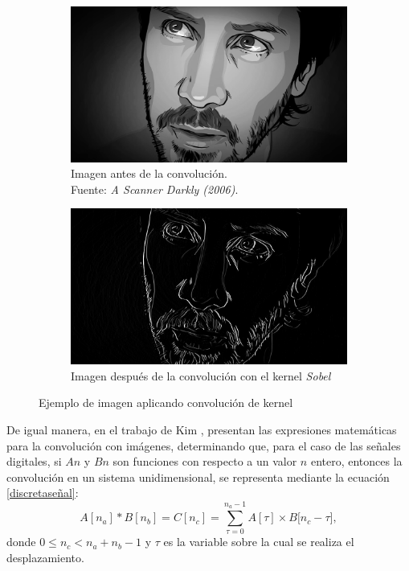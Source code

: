 \documentclass{article}
\begin{document}
\begin{figure}[h]
    \begin{center}
    \captionsetup{justification=centering}
    \begin{subfigure}[b]{0.4\textwidth}
        \includegraphics[scale=0.22]{Figures/darkly.jpg}
        \caption{Imagen antes de la convolución. \\ Fuente: \textit{A Scanner Darkly (2006)}.}
    \end{subfigure}
    \begin{subfigure}[b]{0.4\textwidth}
        \includegraphics[scale=0.22]{Figures/imagenSolbe.jpeg}
        \caption{Imagen después de la convolución con el kernel \textit{Sobel}}
    \end{subfigure}
    \caption{Ejemplo de imagen aplicando convolución de kernel}
    \label{convolucionpractica}
    \end{center}
\end{figure}

De igual manera, en el trabajo de Kim \cite{kim}, presentan las expresiones matemáticas para la convolución con imágenes, determinando que, para el caso de las señales digitales, si $A{n}$ y $B{n}$ son funciones con respecto a un valor $n$ entero, entonces la convolución en un sistema unidimensional, se representa mediante la ecuación \ref{discretaseñal}:
\begin{equation} 
A{[n_{a}]} * B{[n_{b}]} = C{[n_{c}]} = \sum_{\tau=0}^{n_{a}-1} A[\tau] \times B{[n_{c}-\tau}],
\label{discretaseñal}
\end{equation}
\noindent donde $0 \leq n_{c} < n_{a} + n_{b} - 1$ y $\tau$ es la variable sobre la cual se realiza el desplazamiento.
\end{document}
